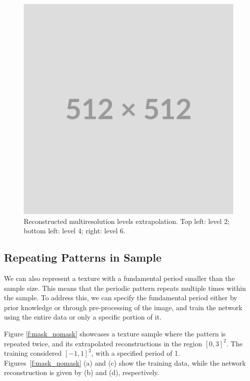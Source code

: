 \begin{figure}[!h]
\centering
\includegraphics[width=0.84\linewidth]{img/placeholder512.png}
\caption{Reconstructed multiresolution levels extrapolation. Top left: level 2; bottom left: level 4; right: level 6.}
\label{f:mr-periodic}
\end{figure}

\subsection{Repeating Patterns in Sample}

We can also represent a texture with a fundamental period smaller than the sample size. 
This means that the periodic pattern repeats multiple times within the sample. 
To address this, we can specify the fundamental period either by prior knowledge or through pre-processing of the image, and train the network using the entire data or only a specific portion of it.

Figure \ref{f:mask_nomask} showcases a texture sample where the pattern is repeated twice, and its extrapolated reconstructions in the region $[0, 3]^2$. The training considered $[-1, 1]^2$, with a specified period of 1. Figures~\ref{f:mask_nomask} (a) and (c) show the training data, while the network reconstruction is given by (b) and (d), respectively. 

